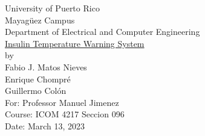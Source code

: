 \begin{titlepage}
  \begin{center}
    \large{University of Puerto Rico\\
    Mayagüez Campus\\
    \vspace{\baselineskip}
    Department of Electrical and Computer Engineering\\}
    \vspace{6cm}
    \Huge{\underline{Insulin Temperature Warning System}\\}
    \vspace{0.5\baselineskip}
    \large by\\
    Fabio J. Matos Nieves\\
    Enrique Chompré\\
    Guillermo Colón\\
    \vspace{4.5cm}
    For: Professor Manuel Jimenez\\
    Course: ICOM 4217 Seccion 096\\
    Date: March 13, 2023\\
    \normalsize

  \end{center}
\end{titlepage}
